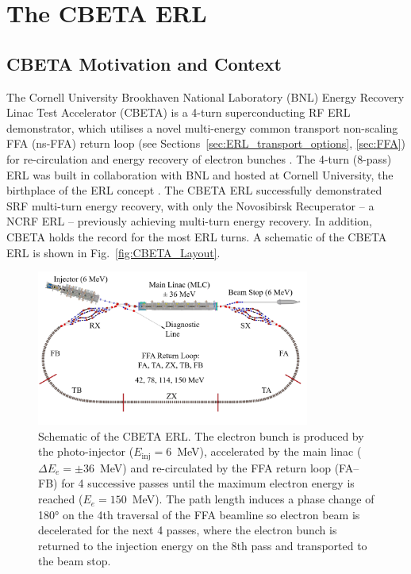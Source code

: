 \documentclass[../main.tex]{subfiles}
\begin{document}
\section{The CBETA ERL}
\label{sec:CBETA_commissioning}
\subsection{CBETA Motivation and Context}

The Cornell University Brookhaven National Laboratory (BNL) Energy Recovery Linac Test Accelerator (CBETA) is a 4-turn superconducting RF ERL demonstrator, which utilises a novel multi-energy common transport  non-scaling FFA (ns-FFA) return loop (see Sections~\ref{sec:ERL_transport_options}, \ref{sec:FFA}) for re-circulation and energy recovery of electron bunches \cite{hoffstaetter2017cbeta,bartnik2020cbeta}. The 4-turn (8-pass) ERL was built in collaboration with BNL and hosted at Cornell University, the birthplace of the ERL concept \cite{tigner1965possible}. The CBETA ERL successfully demonstrated SRF multi-turn energy recovery, with only the Novosibirsk Recuperator \cite{gavrilov2007status} -- a NCRF ERL -- previously achieving multi-turn energy recovery. In addition, CBETA holds the record for the most ERL turns. A schematic of the CBETA ERL is shown in Fig.~\ref{fig:CBETA_Layout}.
\begin{figure}[!h]
\centering
\includegraphics[width=0.8\textwidth]{Figures/CBETA_Multi-Pass_Commissioning/CBETA_4turn.pdf}
\caption{Schematic of the CBETA ERL. The electron bunch is produced by the photo-injector ($E_{\mathrm{inj}} = 6$~\si{\mega\electronvolt}), accelerated by the main linac ($\Delta E_{e} = \pm 36$~\si{\mega\electronvolt}) and re-circulated by the FFA return loop (FA--FB) for 4 successive passes until the maximum electron energy is reached ($E_{e} = 150$~\si{\mega\electronvolt}). The path length induces a phase change of 180\si{\degree} on the 4th traversal of the FFA beamline so electron beam is decelerated for the next 4 passes, where the electron bunch is returned to the injection energy on the 8th pass and transported to the beam stop.}
\label{fig:CBETA_layout}
\end{figure}
\end{document}
